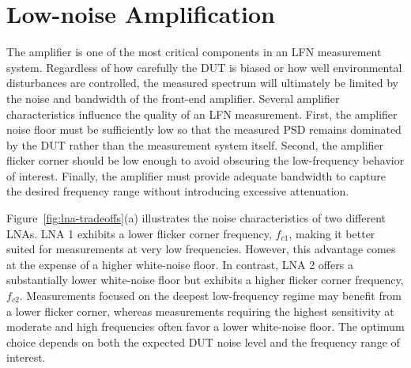 \documentclass[10pt,a4paper]{article}
\begin{document}
	
	
	\section{Low-noise Amplification}
	
	The amplifier is one of the most critical components in an LFN measurement system. Regardless of how carefully the DUT is biased or how well environmental disturbances are controlled, the measured spectrum will ultimately be limited by the noise and bandwidth of the front-end amplifier. Several amplifier characteristics influence the quality of an LFN measurement. First, the amplifier noise floor must be sufficiently low so that the measured PSD remains dominated by the DUT rather than the measurement system itself. Second, the amplifier flicker corner should be low enough to avoid obscuring the low-frequency behavior of interest. Finally, the amplifier must provide adequate bandwidth to capture the desired frequency range without introducing excessive attenuation.
	
	Figure~\ref{fig:lna-tradeoffs}(a) illustrates the noise characteristics of two different LNAs. LNA 1 exhibits a lower flicker corner frequency, $f_{c1}$, making it better suited for measurements at very low frequencies. However, this advantage comes at the expense of a higher white-noise floor. In contrast, LNA 2 offers a substantially lower white-noise floor but exhibits a higher flicker corner frequency, $f_{c2}$. Measurements focused on the deepest low-frequency regime may benefit from a lower flicker corner, whereas measurements requiring the highest sensitivity at moderate and high frequencies often favor a lower white-noise floor. The optimum choice depends on both the expected DUT noise level and the frequency range of interest.
	
\end{document}
